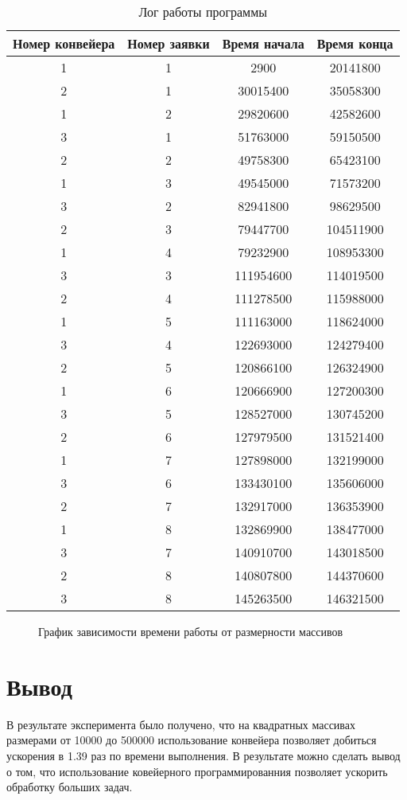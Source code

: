 \begin{table}[ph!]
  \begin{center}
    \captionsetup{justification=raggedright}
     \caption{Лог работы программы}
    \label{tab:workcost_classic}
    \begin{tabular}{c|c|c|c}
      \textbf{Номер конвейера} & \textbf{Номер заявки}  & \textbf{Время начала}  & \textbf{Время конца}\\
      \hline	
		1 & 1 & 2900 & 20141800\\
		2 & 1 & 30015400 & 35058300\\
		1 & 2 & 29820600 & 42582600\\
		3 & 1 & 51763000 & 59150500\\
		2 & 2 & 49758300 & 65423100\\
		1 & 3 & 49545000 & 71573200\\
		3 & 2 & 82941800 & 98629500\\
		2 & 3 & 79447700 & 104511900\\
		1 & 4 & 79232900 & 108953300\\
		3 & 3 & 111954600 & 114019500\\
		2 & 4 & 111278500 & 115988000\\
		1 & 5 & 111163000 & 118624000\\
		3 & 4 & 122693000 & 124279400\\
		2 & 5 & 120866100 & 126324900\\
		1 & 6 & 120666900 & 127200300\\
		3 & 5 & 128527000 & 130745200\\
		2 & 6 & 127979500 & 131521400\\
		1 & 7 & 127898000 & 132199000\\
		3 & 6 & 133430100 & 135606000\\
		2 & 7 & 132917000 & 136353900\\
		1 & 8 & 132869900 & 138477000\\
		3 & 7 & 140910700 & 143018500\\
		2 & 8 & 140807800 & 144370600\\
		3 & 8 & 145263500 & 146321500\\
    \end{tabular}
  \end{center}
\end{table}


\newpage

\begin{figure}[ph!]
	\caption{График зависимости времени работы от размерности массивов}
\end{figure}

\section{Вывод}
В результате эксперимента было получено, что на квадратных массивах размерами от 10000 до 500000 использование конвейера позволяет добиться ускорения в 1.39 раз по времени выполнения. В результате можно сделать вывод о том, что использование ковейерного программированния позволяет ускорить обработку больших задач.